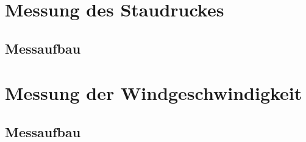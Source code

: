 \section{Messung des Staudruckes}
\subsection{Messaufbau}

\section{Messung der Windgeschwindigkeit}
\subsection{Messaufbau}
